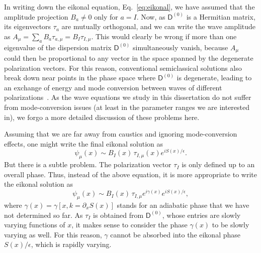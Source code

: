 In writing down the eikonal equation, Eq.~\eqref{eq:eikonal}, we have assumed that the amplitude projection $B_{a} \neq 0$ only for $a = I$.
Now, as $\mathsf{D}^{(0)}$ is a Hermitian matrix, its eigenvectors $\tau_{a}$ are mutually orthogonal, and we can write the wave amplitude as $A_{\mu} = \sum_{a} B_{a} \tau_{a,\mu} = B_{I}\tau_{I,\mu}$.
This would clearly be wrong if more than one eigenvalue of the dispersion matrix $\mathsf{D}^{(0)}$ simultaneously vanish, because $A_{\mu}$ could then be proportional to any vector in the space spanned by the degenerate polarization vectors.
For this reason, conventional semiclassical solutions also break down near points in the phase space where $\mathsf{D}^{(0)}$ is degenerate, leading to an exchange of energy and mode conversion between waves of different polarizations~\cite{tracy2014}.
As the wave equations we study in this dissertation do not suffer from mode-conversion issues (at least in the parameter ranges we are interested in), we forgo a more detailed discussion of these problems here.

Assuming that we are far away from caustics and ignoring mode-conversion effects, one might write the final eikonal solution as
%
\begin{equation}
  \psi_{\mu}(x) \sim B_{I}(x)\,\tau_{I,\mu}(x)e^{iS(x)/\epsilon}.
  \label{eq:psi_wkb_wrong}
\end{equation}
%
But there is a subtle problem.
The polarization vector $\tau_{I}$ is only defined up to an overall phase.
Thus, instead of the above equation, it is more appropriate to write the eikonal solution as
%
\begin{equation}
  \psi_{\mu}(x) \sim B_{I}(x)\,\tau_{I,\mu}e^{i\gamma(x)}e^{iS(x)/\epsilon},
\end{equation}
%
where $\gamma(x) = \gamma[x, k=\partial_{x}S(x)]$ stands for an adiabatic phase that we have not determined so far.
As $\tau_{I}$ is obtained from $\mathsf{D}^{(0)}$, whose entries are slowly varying functions of $x$, it makes sense to consider the phase $\gamma(x)$ to be slowly varying as well.
For this reason, $\gamma$ cannot be absorbed into the eikonal phase $S(x)/\epsilon$, which is rapidly varying.

